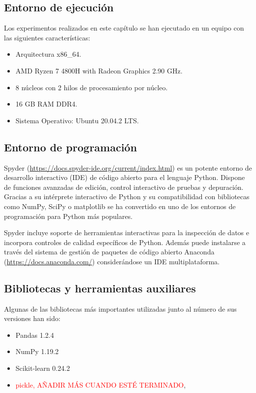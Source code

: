 \documentclass[oneside,openright,titlepage,numbers=noenddot,openany,headinclude,footinclude=true,
cleardoublepage=empty,abstractoff,BCOR=5mm,paper=a4,fontsize=12pt,main=spanish]{scrreprt}
\begin{document}
\subsection{Entorno de ejecución}

Los experimentos realizados en este capítulo se han ejecutado en un equipo con las siguientes características:

\begin{itemize}
    \item Arquitectura x86\_64.
    \item AMD Ryzen 7 4800H with Radeon Graphics 2.90 GHz.
    \item 8 núcleos con 2 hilos de procesamiento por núcleo.
    \item 16 GB RAM DDR4.
    \item Sistema Operativo: Ubuntu 20.04.2 LTS.
\end{itemize}

\subsection{Entorno de programación}

Spyder (\url{https://docs.spyder-ide.org/current/index.html}) es un potente entorno de desarrollo interactivo (IDE) de código abierto para el lenguaje Python. Dispone de funciones avanzadas de edición, control interactivo de pruebas y depuración. Gracias a su intérprete interactivo de Python y su compatibilidad con bibliotecas como NumPy, SciPy o matplotlib se ha convertido en uno de los entornos de programación para Python más populares. 

Spyder incluye soporte de herramientas interactivas para la inspección de datos e incorpora controles de calidad específicos de Python. Además puede instalarse a través del sistema de gestión de paquetes de código abierto Anaconda (\url{https://docs.anaconda.com/}) considerándose un IDE multiplataforma.

\subsection{Bibliotecas y herramientas auxiliares}

Algunas de las bibliotecas más importantes utilizadas junto al número de sus versiones han sido:

\begin{itemize}
    \item Pandas 1.2.4
    \item NumPy 1.19.2
    \item Scikit-learn 0.24.2
    \item \textcolor{red}{pickle, AÑADIR MÁS CUANDO ESTÉ TERMINADO}, %
\end{itemize}
\end{document}
